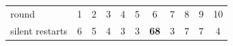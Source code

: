 \begin{tabular}{lcccccccccc}
\toprule
round & 1 & 2 & 3 & 4 & 5 & 6 & 7 & 8 & 9 & 10 \\
silent restarts & 6 & 5 & 4 & 3 & 3 & \textbf{68} & 3 & 7 & 7 & 4 \\
\bottomrule
\end{tabular}
